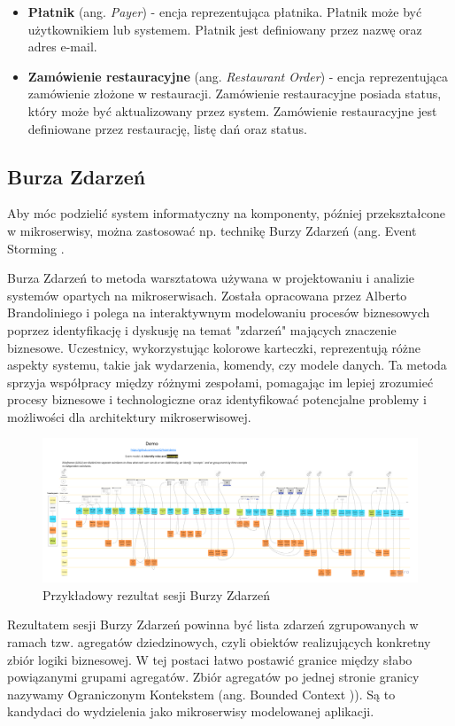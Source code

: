 \begin{itemize}
    \item \textbf{Płatnik} (ang. \textit{Payer}) - encja reprezentująca płatnika. Płatnik może być użytkownikiem lub systemem. Płatnik jest definiowany przez nazwę oraz adres e-mail.
    \item \textbf{Zamówienie restauracyjne} (ang. \textit{Restaurant Order}) - encja reprezentująca zamówienie złożone w restauracji. Zamówienie restauracyjne posiada status, który może być aktualizowany przez system. Zamówienie restauracyjne jest definiowane przez restaurację, listę dań oraz status.

\end{itemize}

\subsection{Burza Zdarzeń}

Aby móc podzielić system informatyczny na komponenty, później przekształcone w mikroserwisy, można zastosować np. technikę Burzy Zdarzeń (ang. Event Storming \cite{eventstorming}.

Burza Zdarzeń to metoda warsztatowa używana w projektowaniu i analizie systemów opartych na mikroserwisach. Została opracowana przez Alberto Brandoliniego i polega na interaktywnym modelowaniu procesów biznesowych poprzez identyfikację i dyskusję na temat "zdarzeń" mających znaczenie biznesowe. Uczestnicy, wykorzystując kolorowe karteczki, reprezentują różne aspekty systemu, takie jak wydarzenia, komendy, czy modele danych. Ta metoda sprzyja współpracy między różnymi zespołami, pomagając im lepiej zrozumieć procesy biznesowe i technologiczne oraz identyfikować potencjalne problemy i możliwości dla architektury mikroserwisowej.

\begin{figure}[!h]
    \centering \includegraphics[width=0.8\linewidth]{event_storming.png}
    \caption{Przykładowy rezultat sesji Burzy Zdarzeń \cite{event_storming_rys}}
\end{figure}


Rezultatem sesji Burzy Zdarzeń powinna być lista zdarzeń zgrupowanych w ramach tzw. agregatów dziedzinowych, czyli obiektów realizujących konkretny zbiór logiki biznesowej. W tej postaci łatwo postawić granice między słabo powiązanymi grupami agregatów. Zbiór agregatów po jednej stronie granicy nazywamy Ograniczonym Kontekstem (ang. Bounded Context \cite{boundedcontext})). Są to kandydaci do wydzielenia jako mikroserwisy modelowanej aplikacji.

